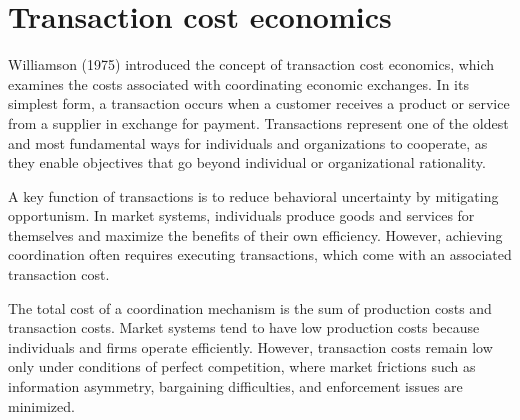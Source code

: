 \section{Transaction cost economics}

Williamson (1975) introduced the concept of transaction cost economics, which examines the costs associated with coordinating economic exchanges. 
In its simplest form, a transaction occurs when a customer receives a product or service from a supplier in exchange for payment. 
Transactions represent one of the oldest and most fundamental ways for individuals and organizations to cooperate, as they enable objectives that go beyond individual or organizational rationality.

A key function of transactions is to reduce behavioral uncertainty by mitigating opportunism. 
In market systems, individuals produce goods and services for themselves and maximize the benefits of their own efficiency. 
However, achieving coordination often requires executing transactions, which come with an associated transaction cost.

The total cost of a coordination mechanism is the sum of production costs and transaction costs. 
Market systems tend to have low production costs because individuals and firms operate efficiently. 
However, transaction costs remain low only under conditions of perfect competition, where market frictions such as information asymmetry, bargaining difficulties, and enforcement issues are minimized.